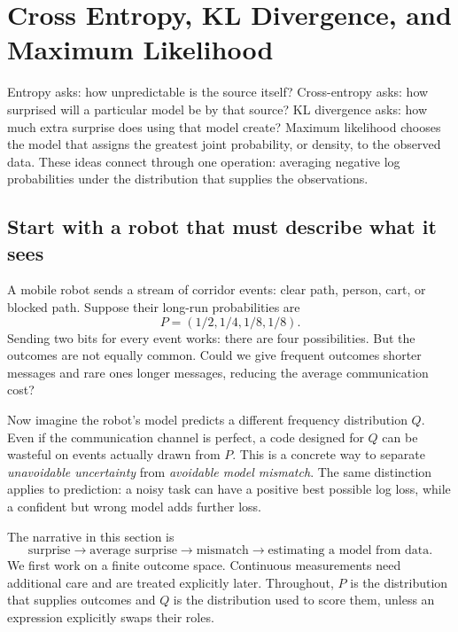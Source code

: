 \section{Cross Entropy, KL Divergence, and Maximum Likelihood}
\label{sec:logreg_to_mlp:cross_entropy_kl_divergence_and_maximum_likelihood}

\begin{keyidea}
Entropy asks: how unpredictable is the source itself? Cross-entropy asks: how
surprised will a particular model be by that source? KL divergence asks: how much
extra surprise does using that model create? Maximum likelihood chooses the
model that assigns the greatest joint probability, or density, to the observed
data. These ideas connect through one operation: averaging negative log
probabilities under the distribution that supplies the observations.
\end{keyidea}

\subsection{Start with a robot that must describe what it sees}
A mobile robot sends a stream of corridor events: clear path, person, cart, or
blocked path. Suppose their long-run probabilities are
\[
P=(1/2,1/4,1/8,1/8).
\]
Sending two bits for every event works: there are four possibilities. But the
outcomes are not equally common. Could we give frequent outcomes shorter messages
and rare ones longer messages, reducing the average communication cost?

Now imagine the robot's model predicts a different frequency distribution $Q$.
Even if the communication channel is perfect, a code designed for $Q$ can be
wasteful on events actually drawn from $P$. This is a concrete way to separate
\emph{unavoidable uncertainty} from \emph{avoidable model mismatch}.
The same distinction applies to prediction: a noisy task can have a positive
best possible log loss, while a confident but wrong model adds further loss.

The narrative in this section is
\[
\text{surprise}\longrightarrow\text{average surprise}\longrightarrow
\text{mismatch}\longrightarrow\text{estimating a model from data}.
\]
We first work on a finite outcome space. Continuous measurements need additional
care and are treated explicitly later. Throughout, $P$ is the distribution that
supplies outcomes and $Q$ is the distribution used to score them, unless an
expression explicitly swaps their roles.

